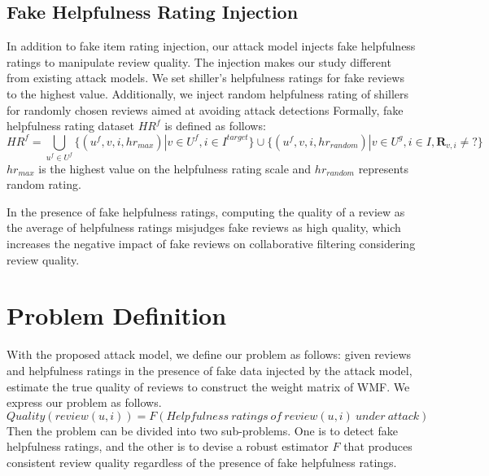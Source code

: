 \documentclass[master,english,final]{kaist-ucs}
\begin{document}
\subsection{Fake Helpfulness Rating Injection}
In addition to fake item rating injection, our attack model injects fake helpfulness ratings to manipulate review quality.
The injection makes our study different from existing attack models.
We set shiller's helpfulness ratings for fake reviews to the highest value.
Additionally, we inject random helpfulness rating of shillers for randomly chosen reviews aimed at avoiding attack detections
Formally, fake helpfulness rating dataset $HR^f$ is defined as follows:
\begin{equation}
HR^f = \bigcup_{u^f \in U^f} \{(u^f,v, i, hr_{max}) | v \in U^f,i \in I^{target} \} \cup \{(u^f,v,i,hr_{random}) | v \in U^g, i \in I, \bm{R}_{v,i} \neq ? \}
\end{equation}
$hr_{max}$ is the highest value on the helpfulness rating scale and $hr_{random}$ represents random rating.

In the presence of fake helpfulness ratings, computing the quality of a review as the average of helpfulness ratings misjudges fake reviews as high quality, which increases the negative impact of fake reviews on collaborative filtering considering review quality.

\section{Problem Definition}
With the proposed attack model, we define our problem as follows: given reviews and helpfulness ratings in the presence of fake data injected by the attack model, estimate the true quality of reviews to construct the weight matrix of WMF.
We express our problem as follows.
\begin{equation} \label{eq:quality_measure}
Quality(review(u,i))=F(Helpfulness\ ratings\ of\ review(u,i)\ under\ attack)
\end{equation}
Then the problem can be divided into two sub-problems.
One is to detect fake helpfulness ratings, and the other is to devise a robust estimator $F$ that produces consistent review quality regardless of the presence of fake helpfulness ratings.
\end{document}
